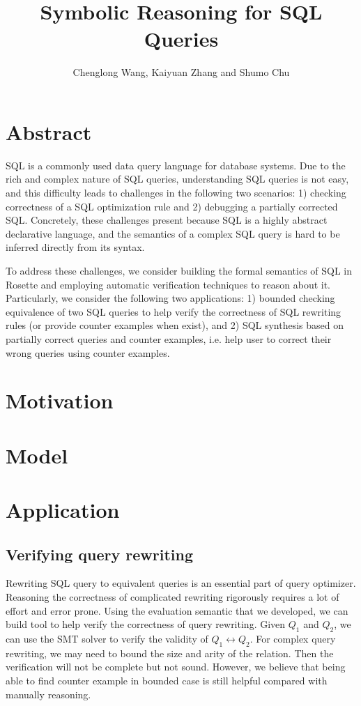 \documentclass{article}
\begin{document}
\title{Symbolic Reasoning for SQL Queries}
\author{Chenglong Wang, Kaiyuan Zhang and Shumo Chu}
\date{}
\maketitle

\section*{Abstract}
SQL is a commonly used data query language for database systems. Due to the rich and complex nature of SQL queries, understanding SQL queries is not easy, and this difficulty leads to challenges in the following two scenarios: 1) checking correctness of a SQL optimization rule and 2) debugging a partially corrected SQL. Concretely, these challenges present because SQL is a highly abstract declarative language, and the semantics of a complex SQL query is hard to be inferred directly from its syntax.

To address these challenges, we consider building the formal semantics of SQL in Rosette and employing automatic verification techniques to reason about it. Particularly, we consider the following two applications: 1) bounded checking equivalence of two SQL queries to help verify the correctness of SQL rewriting rules (or provide counter examples when exist), and 2) SQL synthesis based on partially correct queries and counter examples, i.e. help user to correct their wrong queries using counter examples.

\section{Motivation}

\section{Model}

\section{Application}
\subsection{Verifying query rewriting}
Rewriting SQL query to equivalent queries is an essential part of query
optimizer. Reasoning the correctness of complicated rewriting rigorously 
requires a lot of effort and error prone.
Using the evaluation semantic that we developed, we can build tool to help 
verify the correctness of query rewriting. Given $Q_1$ and $Q_2$, we can use 
the SMT solver to verify the validity of $Q_1 \leftrightarrow Q_2$. 
For complex query rewriting, we may need to bound the size and arity of the
 relation. Then the verification will not be complete but not sound. 
However, we believe that being able to find counter example in bounded case is 
still helpful compared with manually reasoning. 

\subsection{}
\end{document}
